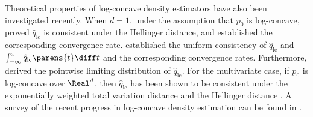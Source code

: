 \documentclass[12pt]{article}
\theoremstyle{definition}
\theoremstyle{theorem}
\theoremstyle{remark}
\begin{document}
Theoretical properties of log-concave density estimators have also been investigated recently. When $d = 1$, under the assumption that $p_0$ is log-concave, \textcites{Pal2007-ai} proved $\hat{q}_{\mathrm{lc}}$ is consistent under the Hellinger distance, and \textcites{Doss2016-kx} established the corresponding convergence rate. 
\textcites{Dumbgen2009-br} established the uniform consistency of $\hat{q}_{\mathrm{lc}}$ and $\int_{-\infty}^x \hat{q}_{\mathrm{lc}} \parens{t} \diff t$ and the corresponding convergence rates. 
Furthermore, \textcite{Balabdaoui2009-fz} derived the pointwise limiting distribution of $\hat{q}_{\mathrm{lc}}$. 
For the multivariate case, if $p_0$ is log-concave over $\Real^d$, then $\hat{q}_{\mathrm{lc}}$ has been shown to be consistent under the exponentially weighted total variation distance and the Hellinger distance \parencite{Cule2010-lc, Dumbgen2011-fu, Kim2016-zr}. A survey of the recent progress in log-concave density estimation can be found in \textcites{Samworth2018-bw}. 

\end{document}

